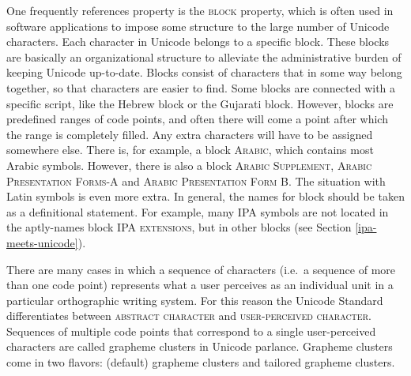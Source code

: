 One frequently references property is the \textsc{block} property, which is often used in software applications to impose some structure to the large number of Unicode characters. Each character in Unicode belongs to a specific block. These blocks are basically an organizational structure to alleviate the administrative burden of keeping Unicode up-to-date. Blocks consist of characters that in some way belong together, so that characters are easier to find. Some blocks are connected with a specific script, like the Hebrew block or the Gujarati block. However, blocks are predefined ranges of code points, and often there will come a point after which the range is completely filled. Any extra characters will have to be assigned somewhere else. There is, for example, a block \textsc{Arabic}, which contains most Arabic symbols. However, there is also a block \textsc{Arabic Supplement}, \textsc{Arabic Presentation Forms-A} and \textsc{Arabic Presentation Form B}. The situation with Latin symbols is even more extra. In general, the names for block should be taken as a definitional statement. For example, many IPA symbols are not located in the aptly-names block \textsc{IPA extensions}, but in other blocks (see Section \ref{ipa-meets-unicode}).

There are many cases in which a sequence of characters (i.e.~a sequence of more than one code point) represents what a user perceives as an individual unit in a particular orthographic writing system. For this reason the Unicode Standard differentiates between \textsc{abstract character} and \textsc{user-perceived character}. Sequences of multiple code points that correspond to a single user-perceived characters are called grapheme clusters in Unicode parlance. Grapheme clusters come in two flavors: (default) grapheme clusters and tailored grapheme clusters.


